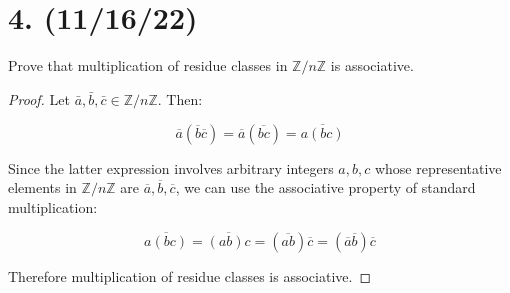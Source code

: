 \documentclass{article}
\begin{document}
\section*{4. (11/16/22)}

Prove that multiplication of residue classes in $\mathbb{Z}/n\mathbb{Z}$ is associative.

\begin{proof}
      Let $\bar{a}, \bar{b}, \bar{c} \in \mathbb{Z}/n\mathbb{Z}$. Then:

      \begin{equation*}
            \overline{a}(\overline{b}\overline{c}) = \overline{a}(\overline{bc}) = \overline{a(bc)}
      \end{equation*}

      Since the latter expression involves arbitrary integers $a, b, c$ whose representative elements in $\mathbb{Z}/n\mathbb{Z}$ are $\overline{a}, \overline{b}, \overline{c}$, we can use the associative property of standard multiplication:

      \begin{equation*}
            \overline{a(bc)} = \overline{(ab)c} = (\overline{ab})\overline{c} = (\overline{a}\overline{b})\overline{c} 
      \end{equation*}

      Therefore multiplication of residue classes is associative.
\end{proof}
\end{document}
